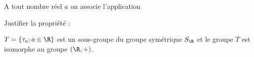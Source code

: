 A tout nombre réel $a$ on associe l'application 


Justifier la propriété :

$T = \{\tau_a; a \in \R\}$ est un sous-groupe du groupe symétrique $S_\R$ et le groupe $T$ est isomorphe au groupe $(\R, +)$.